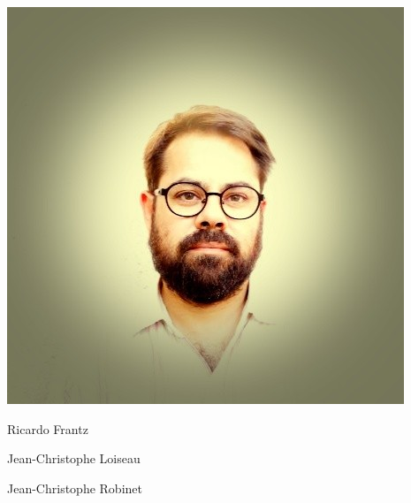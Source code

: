 \documentclass[aspectratio=169, usenames, dvipsnames]{beamer}
\begin{document}
\begin{frame}
\begin{minipage}{.32\textwidth}
  \end{minipage}
  \hfill
  \begin{minipage}{.32\textwidth}
    \centering
    \includegraphics[height=.42\textheight]{robinet}
  \end{minipage}

  \bigskip
  \begin{minipage}{.32\textwidth}
    \centering
    \tiny
    Ricardo Frantz
  \end{minipage}%
  \hfill
  \begin{minipage}{.32\textwidth}
    \centering
    \tiny
    Jean-Christophe Loiseau
  \end{minipage}
  \hfill
  \begin{minipage}{.32\textwidth}
    \centering
    \tiny
    Jean-Christophe Robinet
  \end{minipage}

  \vfill
\end{frame}




\end{document}
